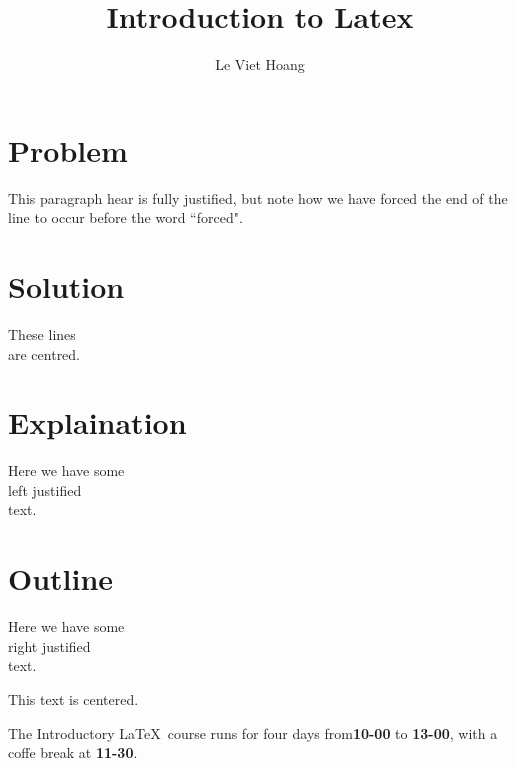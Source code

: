 \documentclass{article}
\title{Introduction to Latex}
\author{Le Viet Hoang}
\begin{document}
\tableofcontents
\maketitle
\section{Problem}
\label{sec: problem}
This paragraph hear is fully justified, but note how we have \linebreak
forced the end of the line to occur before the word ``forced".
\section{Solution}
\label{sec: solution}
\begin{center}
    These lines\\
    are centred.
\end{center}
\section{Explaination}
\label{sec: explain}
\begin{flushleft}
    Here we have some\\ left justified \\text.

\end{flushleft}
\section{Outline}
\label{sec: outline}
\begin{flushright}
    Here we have some\\ right justified\\ text.
\end{flushright}

\centerline{This text is centered.}
\newcommand{\timeOfDay}[2]{\textbf{#1-#2}}
The Introductory \LaTeX \ course runs for four days from\timeOfDay{10}{00} to \timeOfDay{13}{00}, with a coffe break at \timeOfDay{11}{30}.
\end{document}
